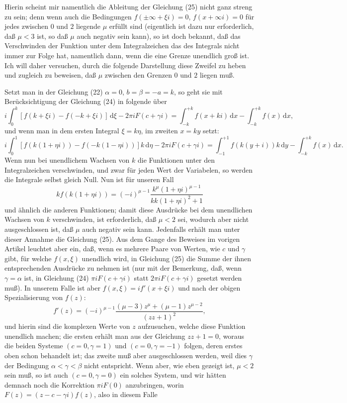 \documentclass[11pt]{article}
\newcommand{\dd}{\,\mathrm d}
\begin{document}
Hierin scheint mir namentlich die Ableitung der Gleichung (25) nicht ganz streng zu sein; denn wenn auch die Bedingungen $f(\pm\infty+\xi i)=0$, $f(x+\infty i)=0$ für jedes zwischen $0$ und $2$ liegende $\mu$ erfüllt sind (eigentlich ist dazu nur erforderlich, daß $\mu<3$ ist, so daß $\mu$ auch negativ sein kann), so ist doch bekannt, daß das Verschwinden der Funktion unter dem Integralzeichen das des Integrals nicht immer zur Folge hat, namentlich dann, wenn die eine Grenze unendlich groß ist. Ich will daher versuchen, durch die folgende Darstellung diese Zweifel zu heben und zugleich zu beweisen, daß $\mu$ zwischen den Grenzen $0$ und $2$ liegen muß.

Setzt man in der Gleichung (22) $\alpha=0$, $b=\beta=-a=k$, so geht sie mit Berücksichtigung der Gleichung (24) in folgende über
\[
i\int_0^k [f(k+\xi i)-f(-k+\xi i)]\dd\xi-2\pi i F(c+\gamma i)
=\int_{-k}^{+k} f(x+ki)\dd x-\int_{-k}^{+k} f(x)\dd x,
\]
und wenn man in dem ersten Integral $\xi=k\eta$, im zweiten $x=ky$ setzt:
\[
i\int_0^1 [f(k(1+\eta i))-f(-k(1-\eta i))]k\dd\eta-2\pi iF(c+\gamma i)
=\int_{-1}^{+1}f(k(y+i))k\dd y-\int_{-k}^{+k}f(x)\dd x.
\]
Wenn nun bei unendlichem Wachsen von $k$ die Funktionen unter den Integralzeichen verschwinden, und zwar für jeden Wert der Variabelen, so werden die Integrale selbst gleich Null. Nun ist für unseren Fall
\[
kf(k(1+\eta i))=(-i)^{\mu-1}\frac{k^\mu(1+\eta i)^{\mu-1}}{kk(1+\eta i)^2+1}
\]
und ähnlich die anderen Funktionen; damit diese Ausdrücke bei dem unendlichen Wachsen von $k$ verschwinden, ist erforderlich, daß $\mu<2$ sei, wodurch aber nicht ausgeschlossen ist, daß $\mu$ auch negativ sein kann. Jedenfalls erhält man unter dieser Annahme die Gleichung (25). Aus dem Gange des Beweises im vorigen Artikel leuchtet aber ein, daß, wenn es mehrere Paare von Werten, wie $c$ und $\gamma$ gibt, für welche $f(x,\xi)$ unendlich wird, in Gleichung (25) die Summe der ihnen entsprechenden Ausdrücke zu nehmen ist (nur mit der Bemerkung, daß, wenn $\gamma=\alpha$ ist, in Gleichung (24) $\pi iF(c+\gamma i)$ statt $2\pi iF(c+\gamma i)$ gesetzt werden muß). In unserem Falle ist aber $f(x,\xi)=i f'(x+\xi i)$ und nach der obigen Spezialisierung von $f(z)$:
\[
f'(z)=(-i)^{\mu-1}\frac{(\mu-3)z^\mu+(\mu-1)z^{\mu-2}}{(zz+1)^2},
\]
und hierin sind die komplexen Werte von $z$ aufzusuchen, welche diese Funktion unendlich machen; die ersten erhält man aus der Gleichung $zz+1=0$, woraus die beiden Systeme $(c=0,\gamma=1)$ und $(c=0,\gamma=-1)$ folgen, deren erstes oben schon behandelt ist; das zweite muß aber ausgeschlossen werden, weil dies $\gamma$ der Bedingung $\alpha<\gamma<\beta$ nicht entspricht. Wenn aber, wie eben gezeigt ist, $\mu<2$ sein muß, so ist auch $(c=0,\gamma=0)$ ein solches System, und wir hätten demnach noch die Korrektion $\pi iF(0)$ anzubringen, worin $F(z)=(z-c-\gamma i)f(z)$, also in diesem Falle
\end{document}
